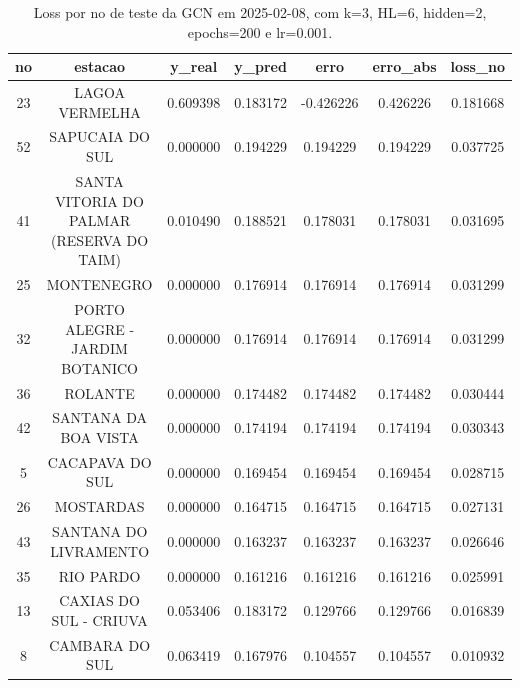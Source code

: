 \begin{table}[h]
\centering
\caption{Loss por no de teste da GCN em 2025-02-08, com k=3, HL=6, hidden=2, epochs=200 e lr=0.001.}
\label{tab:gcn_loss_k3_hl6_h2_e200_d20250208}
\begin{tabular}{ccccccc}
\toprule
no & estacao & y\_real & y\_pred & erro & erro\_abs & loss\_no \\
\midrule
23 & LAGOA VERMELHA & 0.609398 & 0.183172 & -0.426226 & 0.426226 & 0.181668 \\
52 & SAPUCAIA DO SUL & 0.000000 & 0.194229 & 0.194229 & 0.194229 & 0.037725 \\
41 & SANTA VITORIA DO PALMAR (RESERVA DO TAIM) & 0.010490 & 0.188521 & 0.178031 & 0.178031 & 0.031695 \\
25 & MONTENEGRO & 0.000000 & 0.176914 & 0.176914 & 0.176914 & 0.031299 \\
32 & PORTO ALEGRE - JARDIM BOTANICO & 0.000000 & 0.176914 & 0.176914 & 0.176914 & 0.031299 \\
36 & ROLANTE & 0.000000 & 0.174482 & 0.174482 & 0.174482 & 0.030444 \\
42 & SANTANA DA BOA VISTA & 0.000000 & 0.174194 & 0.174194 & 0.174194 & 0.030343 \\
5 & CACAPAVA DO SUL & 0.000000 & 0.169454 & 0.169454 & 0.169454 & 0.028715 \\
26 & MOSTARDAS & 0.000000 & 0.164715 & 0.164715 & 0.164715 & 0.027131 \\
43 & SANTANA DO LIVRAMENTO & 0.000000 & 0.163237 & 0.163237 & 0.163237 & 0.026646 \\
35 & RIO PARDO & 0.000000 & 0.161216 & 0.161216 & 0.161216 & 0.025991 \\
13 & CAXIAS DO SUL - CRIUVA & 0.053406 & 0.183172 & 0.129766 & 0.129766 & 0.016839 \\
8 & CAMBARA DO SUL & 0.063419 & 0.167976 & 0.104557 & 0.104557 & 0.010932 \\
\bottomrule
\end{tabular}
\end{table}
